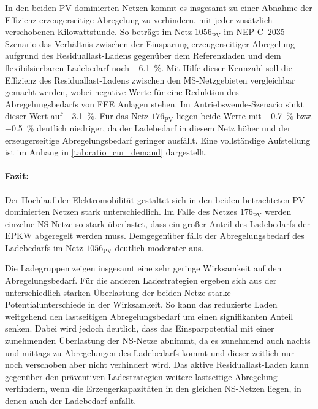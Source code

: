 

In den beiden \gls{PV}-dominierten Netzen kommt es insgesamt zu einer Abnahme der Effizienz erzeugerseitige Abregelung zu verhindern, mit jeder zusätzlich verschobenen Kilowattstunde.
So beträgt im Netz \(1056_{\text{PV}}\) im NEP C~\num{2035} Szenario das Verhältnis zwischen der Einsparung erzeugerseitiger Abregelung aufgrund des Residuallast-Ladens gegenüber dem Referenzladen und dem flexibilsierbaren Ladebedarf noch \SI{-6.1}{\percent}.
Mit Hilfe dieser Kennzahl soll die Effizienz des Residuallast-Ladens zwischen den \gls{MS}-Netzgebieten vergleichbar gemacht werden, wobei negative Werte für eine Reduktion des Abregelungsbedarfs von \gls{FEE} Anlagen stehen.
Im Antriebswende-Szenario sinkt dieser Wert auf \SI{-3.1}{\percent}.
Für das Netz \(176_{\text{PV}}\) liegen beide Werte mit \SI{-0.7}{\percent} bzw. \SI{-0.5}{\percent} deutlich niedriger, da der Ladebedarf in diesem Netz höher und der erzeugerseitige Abregelungsbedarf geringer ausfällt.
Eine vollständige Aufstellung ist im Anhang in \autoref{tab:ratio_cur_demand} dargestellt.

\paragraph{Fazit:}

Der Hochlauf der Elektromobilität gestaltet sich in den beiden betrachteten \gls{PV}-dominierten Netzen stark unterschiedlich.
Im Falle des Netzes \(176_{\text{PV}}\) werden einzelne \gls{NS}-Netze so stark überlastet, dass ein großer Anteil des Ladebedarfs der \gls{EPKW} abgeregelt werden muss.
Demgegenüber fällt der Abregelungsbedarf des Ladebedarfs im Netz \(1056_{\text{PV}}\) deutlich moderater aus. \medskip

Die Ladegruppen zeigen insgesamt eine sehr geringe Wirksamkeit auf den Abregelungsbedarf.
Für die anderen Ladestrategien ergeben sich aus der unterschiedlich starken Überlastung der beiden Netze starke Potentialunterschiede in der Wirksamkeit.
So kann das reduzierte Laden weitgehend den lastseitigen Abregelungsbedarf um einen signifikanten Anteil senken.
Dabei wird jedoch deutlich, dass das Einsparpotential mit einer zunehmenden Überlastung der \gls{NS}-Netze abnimmt, da es zunehmend auch nachts und mittags zu Abregelungen des Ladebedarfs kommt und dieser zeitlich nur noch verschoben aber nicht verhindert wird.
Das aktive Residuallast-Laden kann gegenüber den präventiven Ladestrategien weitere lastseitige Abregelung verhindern, wenn die Erzeugerkapazitäten in den gleichen \gls{NS}-Netzen liegen, in denen auch der Ladebedarf anfällt.\medskip

